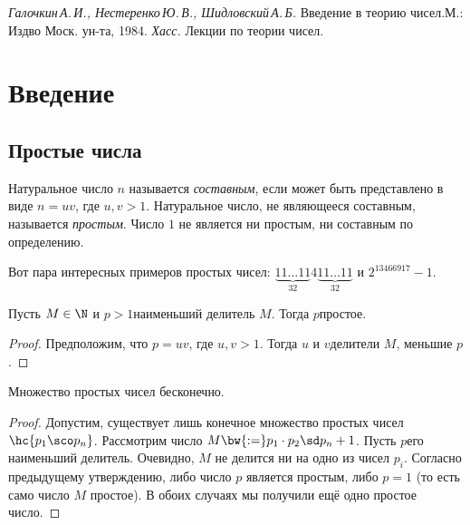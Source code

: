 \documentclass[a4paper]{article}
\begin{document}
\begin{thebibliography}{1}
\setlength{\itemsep}{-2pt}
 \emph{Галочкин\,А.\,И., Нестеренко\,Ю.\,В., Шидловский\,А.\,Б.} Введение в теорию чисел.\т М.: Изд\д во Моск. ун-та, 1984.
 \emph{Хасс.} Лекции по теории чисел.
\end{thebibliography}

\newpage

\tableofcontents

\newpage


\section{Введение}

\subsection{Простые числа}

\begin{df}
Натуральное число $n$ называется \emph{составным}, если может быть представлено в виде ${n=uv}$, где ${u,v>1}$.
Натуральное число, не являющееся составным, называется \emph{простым}. Число $1$ не является ни простым,
ни составным по определению.
\end{df}

Вот пара интересных примеров простых чисел: $\underbrace{11\dots11}_{32}4\underbrace{11\dots11}_{32}$ и
$2^{13466917}-1$.

\begin{stm}
Пусть $M\in\N$ и $p>1$\т наименьший делитель $M$. Тогда $p$\т простое.
\end{stm}
\begin{proof}
Предположим, что $p=uv$, где $u,v>1$. Тогда $u$ и $v$\т делители $M$, меньшие $p$.
\end{proof}

\begin{theorem}[Евклид] Множество простых чисел бесконечно.
\end{theorem}
\begin{proof}
Допустим, существует лишь конечное множество простых чисел $\hc{p_1\sco p_n}$. Рассмотрим число $M\bw{:=}p_1\cdot p_2\sd p_n+1$.
Пусть $p$\т его наименьший делитель. Очевидно, $M$ не делится ни на одно из чисел $p_i$. Согласно предыдущему
утверждению, либо число $p$ является простым, либо $p=1$ (то есть само число $M$ простое).
В обоих случаях мы получили ещё одно простое число.
\end{proof}
\end{document}
